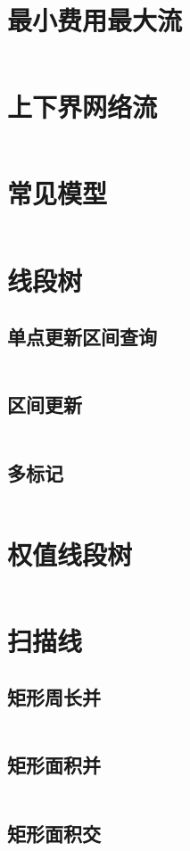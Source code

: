 \documentclass[a4paper,11pt]{article}
\begin{document}
\section*{最小费用最大流}
\inputminted[]{c++}{Template/NetworkFlow/mcmf.cpp}
\section*{上下界网络流}
\inputminted[]{c++}{Template/NetworkFlow/UpDownFlow.cpp}
\section*{常见模型}
\inputminted[]{c++}{Template/NetworkFlow/FlowModel.cpp}

\newpage
\section*{线段树}
\subsection*{单点更新区间查询}
\inputminted[]{c++}{Template/Segment/SegTreeI.cpp}
\subsection*{区间更新}
\inputminted[]{c++}{Template/Segment/SegTreeII.cpp}
\subsection*{多标记}
\inputminted[]{c++}{Template/Segment/SegTreeIII.cpp}
\section*{权值线段树}
\inputminted[]{c++}{Template/Segment/WeightSegTree.cpp}
\section*{扫描线}
\subsection*{矩形周长并}
\inputminted[]{c++}{Template/Segment/poj1177.cpp}
\subsection*{矩形面积并}
\inputminted[]{c++}{Template/Segment/hdu1542.cpp}
\subsection*{矩形面积交}
\inputminted[]{c++}{Template/Segment/hdu1255.cpp}
\end{document}
